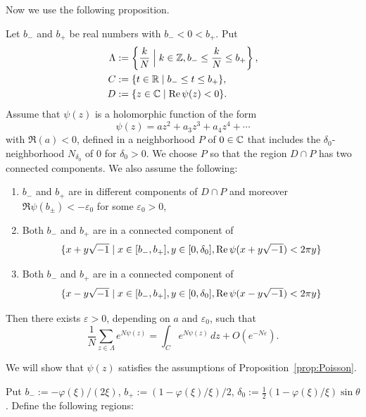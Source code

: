 Now we use the following proposition.
\begin{prop}\label{prop:Poisson}
Let $b_{-}$ and $b_{+}$ be real numbers with $b_{-}<0<b_{+}$.
Put
\begin{align*}
  \Lambda
  &:=
  \left\{
    \frac{k}{N}\Bigm| k\in\mathbb{Z}, b_{-}\le\frac{k}{N}\le b_{+}
  \right\},
  \\
  C
  &:=
  \{t\in\mathbb{R}\mid b_{-}\le t\le b_{+}\},
  \\
  D
  &:=
  \{z\in\mathbb{C}\mid\operatorname{Re}{\psi(z)}<0\}.
\end{align*}
Assume that $\psi(z)$ is a holomorphic function of the form
\begin{equation}\label{eq:f}
  \psi(z)
  =
  az^2+a_3z^3+a_4z^4+\cdots
\end{equation}
with $\Re(a)<0$, defined in a neighborhood $P$ of $0\in\mathbb{C}$ that includes the $\delta_0$-neighborhood $N_{\delta_0}$ of $0$ for $\delta_0>0$.
We choose $P$ so that the region $D\cap P$ has two connected components.
We also assume the following:
\begin{enumerate}
\item
$b_{-}$ and $b_{+}$ are in different components of $D\cap P$ and moreover $\Re{\psi(b_{\pm})}<-\varepsilon_0$ for some $\varepsilon_0>0$,
\item
Both $b_{-}$ and $b_{+}$ are in a connected component of
\begin{equation}\label{eq:R+}
  \{x+y\sqrt{-1}\mid x\in[b_{-},b_{+}],y\in[0,\delta_0],\operatorname{Re}{\psi(x+y\sqrt{-1})}<2\pi y\}
\end{equation}
\item
Both $b_{-}$ and $b_{+}$ are in a connected component of
\begin{equation}\label{eq:R-}
  \{x-y\sqrt{-1}\mid x\in[b_{-},b_{+}],y\in[0,\delta_0],\operatorname{Re}{\psi(x-y\sqrt{-1})}<2\pi y\}
\end{equation}
\end{enumerate}
Then there exists $\varepsilon>0$, depending on $a$ and $\varepsilon_0$, such that
\begin{equation*}
  \frac{1}{N}
  \sum_{z\in\Lambda}
  e^{N\psi(z)}
  =
  \int_{C}e^{N\psi(z)}\,dz
  +
  O(e^{-N\varepsilon}).
\end{equation*}
\end{prop}
We will show that $\psi(z)$ satisfies the assumptions of Proposition~\ref{prop:Poisson}.
\par
Put $b_{-}:=-\varphi(\xi)/(2\xi)$, $b_{+}:=(1-\varphi(\xi)/\xi)/2$, $\delta_0:=\frac{1}{2}(1-\varphi(\xi)/\xi)\sin\theta$.
Define the following regions:
